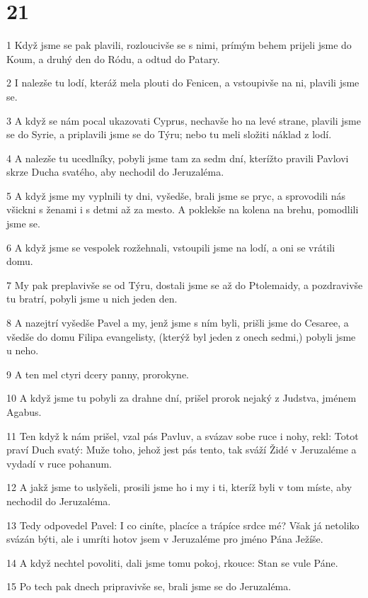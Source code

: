 \chapter{21}

\par 1 Když jsme se pak plavili, rozloucivše se s nimi, prímým behem prijeli jsme do Koum, a druhý den do Ródu, a odtud do Patary.
\par 2 I nalezše tu lodí, kteráž mela plouti do Fenicen, a vstoupivše na ni, plavili jsme se.
\par 3 A když se nám pocal ukazovati Cyprus, nechavše ho na levé strane, plavili jsme se do Syrie, a priplavili jsme se do Týru; nebo tu meli složiti náklad z lodí.
\par 4 A nalezše tu ucedlníky, pobyli jsme tam za sedm dní, kterížto pravili Pavlovi skrze Ducha svatého, aby nechodil do Jeruzaléma.
\par 5 A když jsme my vyplnili ty dni, vyšedše, brali jsme se pryc, a sprovodili nás všickni s ženami i s detmi až za mesto. A poklekše na kolena na brehu, pomodlili jsme se.
\par 6 A když jsme se vespolek rozžehnali, vstoupili jsme na lodí, a oni se vrátili domu.
\par 7 My pak preplavivše se od Týru, dostali jsme se až do Ptolemaidy, a pozdravivše tu bratrí, pobyli jsme u nich jeden den.
\par 8 A nazejtrí vyšedše Pavel a my, jenž jsme s ním byli, prišli jsme do Cesaree, a všedše do domu Filipa evangelisty, (kterýž byl jeden z onech sedmi,) pobyli jsme u neho.
\par 9 A ten mel ctyri dcery panny, prorokyne.
\par 10 A když jsme tu pobyli za drahne dní, prišel prorok nejaký z Judstva, jménem Agabus.
\par 11 Ten když k nám prišel, vzal pás Pavluv, a svázav sobe ruce i nohy, rekl: Totot praví Duch svatý: Muže toho, jehož jest pás tento, tak sváží Židé v Jeruzaléme a vydadí v ruce pohanum.
\par 12 A jakž jsme to uslyšeli, prosili jsme ho i my i ti, kteríž byli v tom míste, aby nechodil do Jeruzaléma.
\par 13 Tedy odpovedel Pavel: I co ciníte, placíce a trápíce srdce mé? Však já netoliko svázán býti, ale i umríti hotov jsem v Jeruzaléme pro jméno Pána Ježíše.
\par 14 A když nechtel povoliti, dali jsme tomu pokoj, rkouce: Stan se vule Páne.
\par 15 Po tech pak dnech pripravivše se, brali jsme se do Jeruzaléma.
